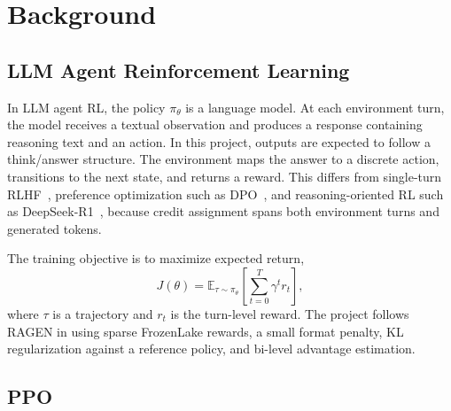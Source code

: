 \section{Background}
\label{sec:background}

\subsection{LLM Agent Reinforcement Learning}

In LLM agent RL, the policy \(\pi_\theta\) is a language model. At each environment turn, the model receives a textual observation and produces a response containing reasoning text and an action. In this project, outputs are expected to follow a think/answer structure. The environment maps the answer to a discrete action, transitions to the next state, and returns a reward. This differs from single-turn RLHF~\citep{ouyang2022training}, preference optimization such as DPO~\citep{rafailov2023dpo}, and reasoning-oriented RL such as DeepSeek-R1~\citep{guo2025deepseekr1}, because credit assignment spans both environment turns and generated tokens.

The training objective is to maximize expected return,
\begin{equation}
J(\theta) = \mathbb{E}_{\tau \sim \pi_\theta}
\left[\sum_{t=0}^{T}\gamma^t r_t\right],
\end{equation}
where \(\tau\) is a trajectory and \(r_t\) is the turn-level reward. The project follows RAGEN in using sparse FrozenLake rewards, a small format penalty, KL regularization against a reference policy, and bi-level advantage estimation.

\subsection{PPO}

